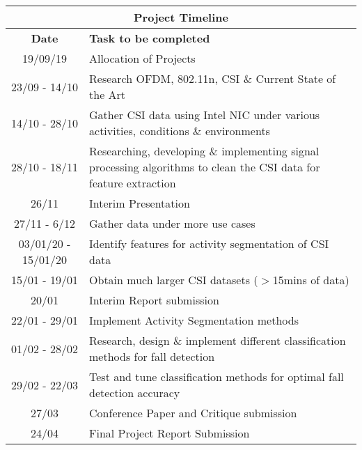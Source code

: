 \begin{center}
\begin{tabular}{|c||p{10cm}|}
 \hline
 \multicolumn{2}{|c|}{\textbf{Project Timeline}} \\
 \hline
 \bfseries Date & \bfseries Task to be completed \\
 \hline
 19/09/19 & Allocation of Projects \\
 23/09 - 14/10 & Research OFDM, 802.11n, CSI \& Current State of the Art \\
 14/10 - 28/10 & Gather CSI data using Intel NIC under various activities, conditions \& environments \\ 
 28/10 - 18/11 & Researching, developing \& implementing signal processing algorithms to clean the CSI data for feature extraction \\
 26/11 & Interim Presentation \\
 27/11 - 6/12 & Gather data under more use cases \\
 03/01/20 - 15/01/20 & Identify features for activity segmentation of CSI data \\
 15/01 - 19/01 & Obtain much larger CSI datasets ($>$15mins of data) \\
 20/01 & Interim Report submission \\
 22/01 - 29/01 & Implement Activity Segmentation methods \\
 01/02 - 28/02 & Research, design \& implement different classification methods for fall detection \\
 29/02 - 22/03 & Test and tune classification methods for optimal fall detection accuracy \\
 27/03 & Conference Paper and Critique submission \\
 24/04 & Final Project Report Submission \\
 \hline
\end{tabular}
\end{center}
